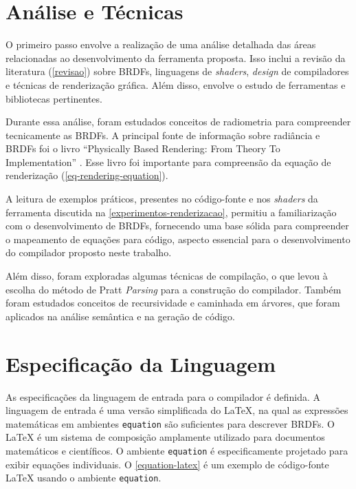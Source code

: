 \section{Análise e Técnicas} \label{analise}


O primeiro passo envolve a realização de uma análise detalhada das áreas relacionadas ao desenvolvimento da ferramenta proposta. Isso inclui a revisão da literatura (\autoref{revisao}) sobre BRDFs, linguagens de \textit{shaders}, \textit{design} de compiladores e técnicas de renderização gráfica. Além disso, envolve o estudo de ferramentas e bibliotecas pertinentes.

Durante essa análise, foram estudados conceitos de radiometria para compreender tecnicamente as BRDFs. A principal fonte de informação sobre radiância e BRDFs foi o livro ``Physically Based Rendering: From Theory To Implementation'' \cite{pbr}. Esse livro foi importante para compreensão da equação de renderização (\autoref{eq-rendering-equation}).

A leitura de exemplos práticos, presentes no código-fonte e nos \textit{shaders} da ferramenta discutida na \autoref{experimentos-renderizacao}, permitiu a familiarização com o desenvolvimento de BRDFs, fornecendo uma base sólida para compreender o mapeamento de equações para código, aspecto essencial para o desenvolvimento do compilador proposto neste trabalho.

Além disso, foram exploradas algumas técnicas de compilação, o que levou à escolha do método de Pratt \textit{Parsing} para a construção do compilador. Também foram estudados conceitos de recursividade e caminhada em árvores, que foram aplicados na análise semântica e na geração de código.


\section{Especificação da Linguagem}\label{especificacao-linguagem}

As especificações da linguagem de entrada para o compilador é definida. A linguagem de entrada é uma versão simplificada do \LaTeX{}, na qual as expressões matemáticas em ambientes \texttt{equation} são suficientes para descrever BRDFs. O \LaTeX{}  é um sistema de composição amplamente utilizado para documentos matemáticos e científicos. O ambiente \texttt{equation} é especificamente projetado para exibir equações individuais. O \autoref{equation-latex} é um exemplo de código-fonte \LaTeX{}  usando o ambiente \texttt{equation}.


